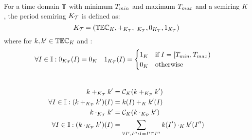 \begin{defi}
  For a time domain $\mathbb{T}$ with minimum $T_{min}$ and maximum
  $T_{max}$ and a semiring $K$, the period semiring
  $K_{\mathcal{T}}$ is defined as:
  $$K_{\mathcal{T}} = (\mathbb{TEC}_{{K}}, +_{K_{\mathcal{T}}}, \cdot_{K_{\mathcal{T}}}, 0_{K_{\mathcal{T}}}, 1_{K_{\mathcal{T}}})$$
  where for $k,k' \in \mathbb{TEC}_{{K}}$ and :
  \begin{align*}
        \forall I \in \mathbb{I}: 0_{K_{\mathcal{T}}}(I) &= 0_{K} &
                                                                              1_{K_{\mathcal{T}}}(I) &=
                             \begin{cases}
                               1_{K} &\text{if}\; I=[T_{min},T_{max})\\
                               0_{K} &\text{otherwise}
                             \end{cases}
  \end{align*}\\[-8mm]
  \begin{align*}
    k +_{K_{\mathcal{T}}} k' &= \mathcal{C}_{{K}}(k +_{K_{\mathcal{P}}} k')\\
\forall I \in \mathbb{I}:
    (k +_{K_{\mathcal{P}}} k')(I) &= k(I) +_{K} k'(I)\\
    k \cdot_{K_{\mathcal{T}}} k' &= \mathcal{C}_{{K}}(k \cdot_{K_{\mathcal{P}}} k')\\
\forall I \in \mathbb{I}:    (k \cdot_{K_{\mathcal{P}}} k')(I) &= \sum_{\forall I', I'': I = I' \cap I''} k(I') \cdot_{K} k'(I'')
  \end{align*}

\end{defi}

